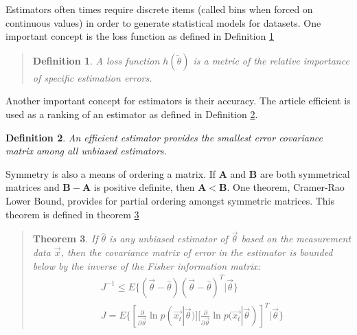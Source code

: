 \documentclass[12pt ]{article}
\newtheorem{thm}{Theorem}[section]
\newtheorem{adef}[thm]{Definition}
\begin{document}
Estimators often times require discrete items (called bins when forced on continuous values) in order to generate statistical models for datasets.  One important concept is the loss function as defined in Definition \ref{lossFunctionDefition}
\begin{quote}
\begin{adef}
	\label{lossFunctionDefition}
A loss function $h(\tilde{\theta})$ is a metric of the relative importance of specific estimation errors.
\end{adef}
\cite[79]{appo-ica-book}
\end{quote}
Another important concept for estimators is their accuracy.  The article efficient is used as a ranking of an estimator as defined in Definition \ref{efficientEstimatorDefinition}.
	\begin{adef}
		\label{efficientEstimatorDefinition}
An efficient estimator provides the smallest error covariance matrix among all unbiased estimators.	
	\end{adef}
\cite[81]{appo-ica-book}
Symmetry is also a means of ordering a matrix.  If $\mathbf{A}$ and $\mathbf{B}$ are both symmetrical matrices and $\mathbf{B} - \mathbf{A}$ is positive definite, then $\mathbf{A} < \mathbf{B}$.  One theorem, Cramer-Rao Lower Bound, provides for partial ordering amongst symmetric matrices.   This theorem is defined in theorem \ref{cramerRaoLowerBound}

\begin{quote}
	\begin{thm}
	\label{cramerRaoLowerBound}
If $\hat{\theta}$ is any unbiased estimator of $\vec{\theta}$ based on the measurement data $\vec{x}$, then the covariance matrix of error in the estimator is bounded below by the inverse of the Fisher information matrix:
\begin{eqnarray}
J^{-1} \le E \{ (\vec{\theta} - \hat{\theta})(\vec{\theta} - \hat{\theta})^T | \vec{\theta} \} \\
J = E \{ [\frac {\partial} {\partial \vec{\theta}} \ln p(\vec{x_t} | \vec{\theta})] [\frac {\partial} {\partial \vec{\theta}} \ln p(\vec{x_t} | \vec{\theta})]^T | \vec{\theta} \}
\end{eqnarray}
	\end{thm}
\cite[83]{appo-ica-book}
\end{quote}
\end{document}
